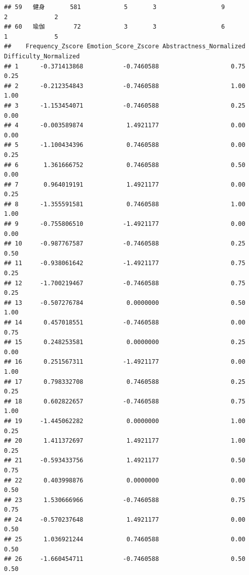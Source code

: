 \documentclass[]{book}
\begin{document}
\begin{verbatim}
## 59   健身       581            5       3                  9          2             2
## 60   瑜伽        72            3       3                  6          1             5
##    Frequency_Zscore Emotion_Score_Zscore Abstractness_Normalized Difficulty_Normalized
## 1      -0.371413868           -0.7460588                    0.75                  0.25
## 2      -0.212354843           -0.7460588                    1.00                  1.00
## 3      -1.153454071           -0.7460588                    0.25                  0.00
## 4      -0.003589874            1.4921177                    0.00                  0.00
## 5      -1.100434396            0.7460588                    0.00                  0.25
## 6       1.361666752            0.7460588                    0.50                  0.00
## 7       0.964019191            1.4921177                    0.00                  0.25
## 8      -1.355591581            0.7460588                    1.00                  1.00
## 9      -0.755806510           -1.4921177                    0.00                  0.00
## 10     -0.987767587           -0.7460588                    0.25                  0.50
## 11     -0.938061642           -1.4921177                    0.75                  0.25
## 12     -1.700219467           -0.7460588                    0.75                  0.25
## 13     -0.507276784            0.0000000                    0.50                  1.00
## 14      0.457018551           -0.7460588                    0.00                  0.75
## 15      0.248253581            0.0000000                    0.25                  0.00
## 16      0.251567311           -1.4921177                    0.00                  1.00
## 17      0.798332708            0.7460588                    0.25                  0.25
## 18      0.602822657           -0.7460588                    0.75                  1.00
## 19     -1.445062282            0.0000000                    1.00                  0.25
## 20      1.411372697            1.4921177                    1.00                  0.25
## 21     -0.593433756            1.4921177                    0.50                  0.75
## 22      0.403998876            0.0000000                    0.00                  0.50
## 23      1.530666966           -0.7460588                    0.75                  0.75
## 24     -0.570237648            1.4921177                    0.00                  0.50
## 25      1.036921244            0.7460588                    0.00                  0.50
## 26     -1.660454711           -0.7460588                    0.50                  0.50

\end{verbatim}
\end{document}
